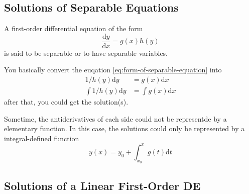 \subsection{Solutions of Separable Equations}
\label{solutions-of-separable-equations}

\begin{definition}
    A first-order differential equation of the form
    \begin{equation}\label{eq:form-of-separable-equation}
        \dfrac{\mathrm{d}y}{\mathrm{d}x} = g(x)h(y)
    \end{equation}
    is said to be separable or to have separable variables.
\end{definition}

You basically convert the euqation \ref{eq:form-of-separable-equation} into
\begin{align*}
    1/h(y) \mathrm{d}y &= g(x) \mathrm{d}x\\
    \int 1/h(y) \mathrm{d}y &= \int g(x) \mathrm{d}x
\end{align*}
after that, you could get the solution(s).

Sometime, the antiderivatives of each side could not be 
representde by a elementary function. 
In this case, the solutions could only be represented by a 
integral-defined function
\[
    y(x) = y_0 + \int_{x_0}^{x} g(t) \mathrm{d}t
\]

\subsection{Solutions of a Linear First-Order DE}

